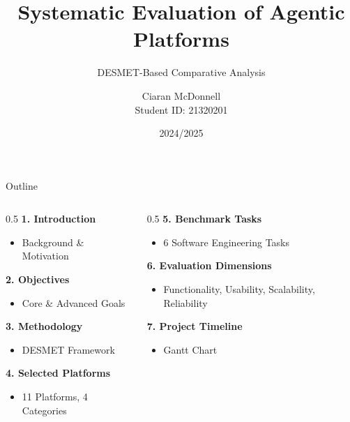 \documentclass[aspectratio=169]{beamer}
\title{Systematic Evaluation of Agentic Platforms}
\subtitle{DESMET-Based Comparative Analysis}
\author{Ciaran McDonnell \\ \small{Student ID: 21320201}}
\institute{University College Dublin \\ School of Computer Science}
\date{2024/2025}
\begin{document}
\begin{frame}
    \titlepage
\end{frame}

\begin{frame}{Outline}
    \begin{columns}[t]
        \begin{column}{0.5\textwidth}
            \textbf{1. Introduction}
            \begin{itemize}
                \item Background \& Motivation
            \end{itemize}

            \vspace{0.3cm}
            \textbf{2. Objectives}
            \begin{itemize}
                \item Core \& Advanced Goals
            \end{itemize}

            \vspace{0.3cm}
            \textbf{3. Methodology}
            \begin{itemize}
                \item DESMET Framework
            \end{itemize}

            \vspace{0.3cm}
            \textbf{4. Selected Platforms}
            \begin{itemize}
                \item 11 Platforms, 4 Categories
            \end{itemize}
        \end{column}
        \begin{column}{0.5\textwidth}
            \textbf{5. Benchmark Tasks}
            \begin{itemize}
                \item 6 Software Engineering Tasks
            \end{itemize}

            \vspace{0.3cm}
            \textbf{6. Evaluation Dimensions}
            \begin{itemize}
                \item Functionality, Usability, Scalability, Reliability
            \end{itemize}

            \vspace{0.3cm}
            \textbf{7. Project Timeline}
            \begin{itemize}
                \item Gantt Chart
            \end{itemize}


\end{column}
\end{columns}
\end{frame}
\end{document}
